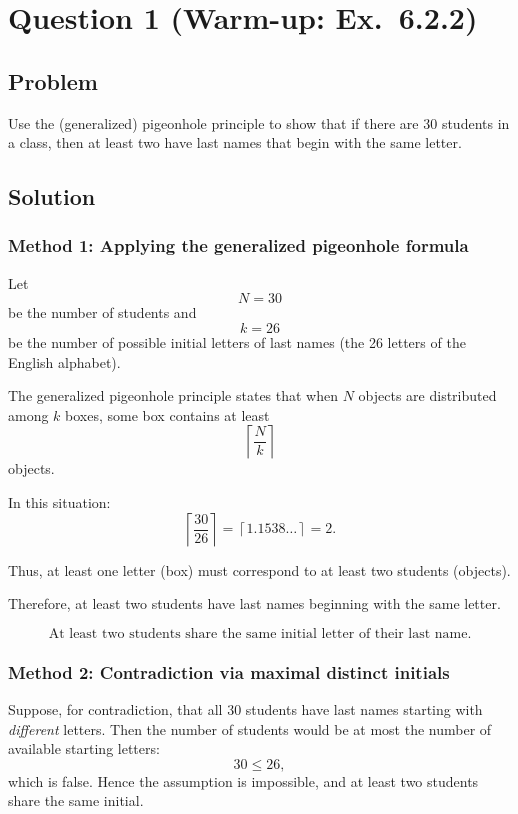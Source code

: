 \documentclass[12pt]{article}
\begin{document}
\newpage
\tableofcontents
\newpage

\section{Question 1 (Warm-up: Ex.\ 6.2.2)}
\subsection{Problem}
Use the (generalized) pigeonhole principle to show that if there are 30 students in a class, then at least two have last names that begin with the same letter.

\subsection{Solution}

\subsubsection{Method 1: Applying the generalized pigeonhole formula}

Let
\[
N=30
\]
be the number of students and
\[
k=26
\]
be the number of possible initial letters of last names (the 26 letters of the English alphabet).

The generalized pigeonhole principle states that when \(N\) objects are distributed among \(k\) boxes, some box contains at least
\[
\left\lceil \frac{N}{k} \right\rceil
\]
objects.

In this situation:
\[
\left\lceil \frac{30}{26} \right\rceil
=
\left\lceil 1.1538\ldots \right\rceil
=
2.
\]

Thus, at least one letter (box) must correspond to at least two students (objects).

Therefore, at least two students have last names beginning with the same letter.

\[
\boxed{\text{At least two students share the same initial letter of their last name.}}
\]
\subsubsection{Method 2: Contradiction via maximal distinct initials}
Suppose, for contradiction, that all 30 students have last names starting with \emph{different} letters. Then the number of students would be at most the number of available starting letters:
\[
30 \le 26,
\]
which is false. Hence the assumption is impossible, and at least two students share the same initial.
\end{document}
